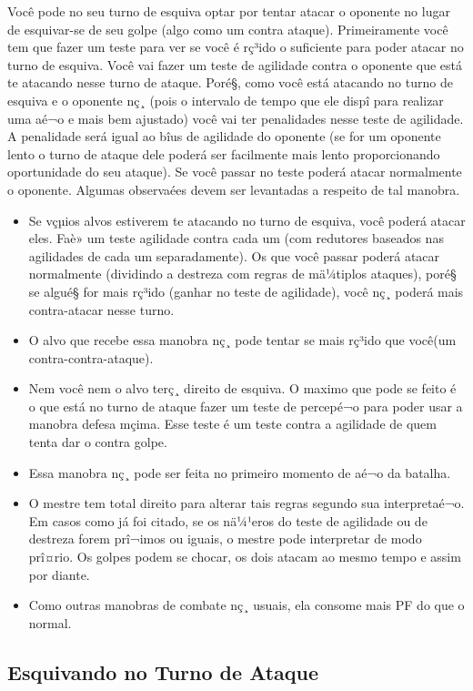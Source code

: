 Você pode no seu turno de esquiva optar por tentar atacar o oponente no lugar de esquivar-se de seu golpe (algo como um contra ataque). Primeiramente você tem que fazer um teste para ver se você é rç³ido o suficiente para poder atacar no turno de esquiva. Você vai fazer um teste de agilidade contra o oponente que está te atacando nesse turno de ataque. Poré§, como você está atacando no turno de esquiva e o oponente nç¸ (pois o intervalo de tempo que ele dispî para realizar uma aé¬o e mais bem ajustado) você vai ter penalidades nesse teste de agilidade. A penalidade será igual ao bîus de agilidade do oponente (se for um oponente lento o turno de ataque dele poderá ser facilmente mais lento proporcionando oportunidade do seu ataque). Se você passar no teste poderá atacar normalmente o oponente. Algumas observaées devem ser levantadas a respeito de tal manobra.
\begin{itemize}
	\item Se vçµios alvos estiverem te atacando no turno de esquiva, você poderá atacar eles. Faè» um teste agilidade contra cada um (com redutores baseados nas agilidades de cada um separadamente). Os que você passar poderá atacar normalmente (dividindo a destreza com regras de mä¼tiplos ataques), poré§ se algué§ for mais rç³ido (ganhar no teste de agilidade), você nç¸ poderá mais contra-atacar nesse turno.
	\item O alvo que recebe essa manobra nç¸ pode tentar se mais rç³ido que você(um contra-contra-ataque).
	\item Nem você nem o alvo terç¸ direito de esquiva. O maximo que pode se feito é o que está no turno de ataque fazer um teste de percepé¬o para poder usar a manobra defesa mçima. Esse teste é um teste contra a agilidade de quem tenta dar o contra golpe.
	\item Essa manobra nç¸ pode ser feita no primeiro momento de aé¬o da batalha.
	\item O mestre tem total direito para alterar tais regras segundo sua interpretaé¬o. Em casos como já foi citado, se os nä¼¹eros do teste de agilidade ou de destreza forem prî¬imos ou iguais, o mestre pode interpretar de modo prî¤rio. Os golpes podem se chocar, os dois atacam ao mesmo tempo e assim por diante.
	\item Como outras manobras de combate nç¸ usuais, ela consome mais PF do que o normal.
\end{itemize}


\subsection{Esquivando no Turno de Ataque }

